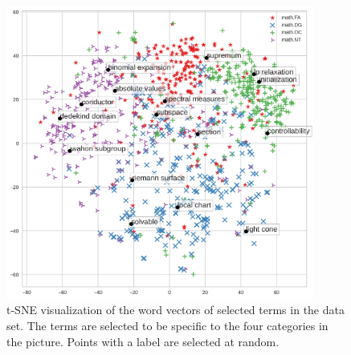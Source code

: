 \documentclass[submission,copyright,creativecommons]{eptcs}
\begin{document}
\begin{figure}
    \centering
    \includegraphics[width=0.9\textwidth]{scatter_plot/m80p300opt135.png}
    \caption{\label{scatter} t-SNE visualization of the word vectors
        of selected terms in the data set. The terms are selected to be specific to 
        the four categories in the picture.  Points with a label are selected
    at random.}
\end{figure}
  



\end{document}
